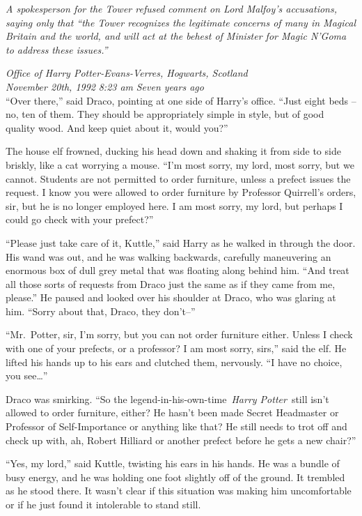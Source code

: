 \emph{A spokesperson for the Tower refused comment on Lord Malfoy's
accusations, saying only that ``the Tower recognizes the legitimate
concerns of many in Magical Britain and the world, and will act at the
behest of Minister for Magic N'Goma to address these issues.''}

\mybreak

\emph{Office of Harry Potter-Evans-Verres, Hogwarts, Scotland}\\
\emph{November 20th, 1992} \emph{8:23 am} \emph{Seven years ago}\\

``Over there,'' said Draco, pointing at one side of Harry's office.
``Just eight beds -- no, ten of them. They should be appropriately
simple in style, but of good quality wood. And keep quiet about it,
would you?''

The house elf frowned, ducking his head down and shaking it from side to
side briskly, like a cat worrying a mouse. ``I'm most sorry, my lord,
most sorry, but we cannot. Students are not permitted to order
furniture, unless a prefect issues the request. I know you were allowed
to order furniture by Professor Quirrell's orders, sir, but he is no
longer employed here. I am most sorry, my lord, but perhaps I could go
check with your prefect?''

``Please just take care of it, Kuttle,'' said Harry as he walked in
through the door. His wand was out, and he was walking backwards,
carefully maneuvering an enormous box of dull grey metal that was
floating along behind him. ``And treat all those sorts of requests from
Draco just the same as if they came from me, please.'' He paused and
looked over his shoulder at Draco, who was glaring at him. ``Sorry about
that, Draco, they don't--''

``Mr.~Potter, sir, I'm sorry, but you can not order furniture either.
Unless I check with one of your prefects, or a professor? I am most
sorry, sirs,'' said the elf. He lifted his hands up to his ears and
clutched them, nervously. ``I have no choice, you see\ldots{}''

Draco was smirking. ``So the legend-in-his-own-time~\emph{Harry
Potter}~still isn't allowed to order furniture, either? He hasn't been
made Secret Headmaster or Professor of Self-Importance or anything like
that? He still needs to trot off and check up with, ah, Robert Hilliard
or another prefect before he gets a new chair?''

``Yes, my lord,'' said Kuttle, twisting his ears in his hands. He was a
bundle of busy energy, and he was holding one foot slightly off of the
ground. It trembled as he stood there. It wasn't clear if this situation
was making him uncomfortable or if he just found it intolerable to stand
still.

